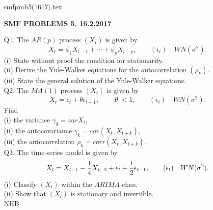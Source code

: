 \documentclass{article}
\begin{document}
\def\ni{\noindent}
\def\i{\indent}
\def\G{\Gamma}
\def\s{\sigma}
\def\t{\theta}
\def\z{\zeta}
\def\p{\partial}
\def\b{\beta}
\def\e{\epsilon}
\ni smfprob5(1617).tex
\begin{center}
{\bf SMF PROBLEMS 5.  16.2.2017}
\end{center}

\ni Q1.  The $AR(p)$ process $(X_t)$ is given by
$$
X_t = {\phi}_1 X_{t-1} + \cdots + {\phi}_p X_{t-p}, \qquad
({\e}_t) \quad WN({\sigma}^2).
$$
(i) State without proof the condition for stationarity. \\
(ii) Derive the Yule-Walker equations for the autocorrelation $({\rho}_k)$. \\
(iii) State the general solution of the Yule-Walker equations.\\

\ni Q2.  The $MA(1)$ process $(X_t)$ is given by
$$
X_t = {\e}_t + \theta {\e}_{t-1}, \qquad |\theta| < 1, \qquad
({\e}_t) \quad WN({\sigma}^2).
$$
Find \\
(i) the variance ${\gamma}_0 = var X_t$, \\
(ii) the autocovariance ${\gamma}_k = cov(X_t, X_{t+k})$, \\
(iii) the autocorrelation ${\rho}_k = corr(X_t, X_{t+k})$.\\

\ni Q3.  The time-series model is given by
$$
X_t = X_{t-1} - {1 \over 4} X_{t-2} + {\e}_t + {1 \over 2} {\e}_{t-1},
 \qquad ({\e}_t) \quad WN({\sigma}^2).
$$
(i) Classify $(X_t)$ within the $ARIMA$ class. \\
(ii) Show that $(X_t)$ is stationary and invertible.\\

\hfil NHB \break
\end{document}
